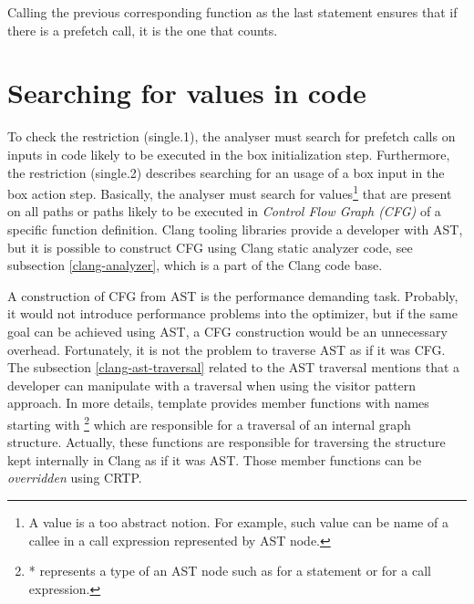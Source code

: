 Calling the previous corresponding  function as the last statement ensures that if there is a prefetch call, it is the one that counts.

\section{Searching for values in code}
To check the restriction (single.1), the analyser must search for prefetch calls on inputs in code likely to be executed in the box initialization step. Furthermore, the restriction (single.2) describes searching for an usage of a box input in the box action step. Basically, the analyser must search for values\footnote{A value is a too abstract notion. For example, such value can be name of a callee in a call expression represented by  AST node.} that are present on all paths or paths likely to be executed in \emph{Control Flow Graph (CFG)} of a specific function definition. Clang tooling libraries provide a developer with AST, but it is possible to construct CFG using Clang static analyzer code, see subsection \ref{clang-analyzer}, which is a part of the Clang code base.

A construction of CFG from AST is the performance demanding task. Probably, it would not introduce performance problems into the optimizer, but if the same goal can be achieved using AST, a CFG construction would be an unnecessary overhead. Fortunately, it is not the problem to traverse AST as if it was CFG. The subsection \ref{clang-ast-traversal} related to the AST traversal mentions that a developer can manipulate with a traversal when using the visitor pattern approach. In more details,  template provides member functions with names starting with \footnote{* represents a type of an AST node such as  for a statement or  for a call expression.} which are responsible for a traversal of an internal graph structure. Actually, these functions are responsible for traversing the structure kept internally in Clang as if it was AST. Those member functions can be \textit{overridden} using CRTP.

